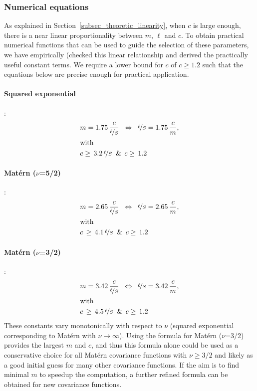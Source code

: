 \subsubsection{Numerical equations}
\label{sec_num_equations}

As explained in Section~\ref{subsec_theoretic_linearity}, when $c$ is large enough, there is a near linear proportionality between $m$, $\ell$ and $c$. To obtain practical numerical functions that can be used to guide the selection of these parameters, we have empirically ({\color{blue}checked this linear relationship and} derived the practically useful constant terms. We require a lower bound for $c$ of $c \geq 1.2$ such that the equations below are precise enough for practical application.

\paragraph*{Squared exponential}:
%
\begin{align}
&m= 1.75 \, \frac{c}{\nicefrac{\ell}{S}} \;\; \Leftrightarrow \;\; \nicefrac{\ell}{S}= 1.75 \, \frac{c}{m},	\label{eq_m_l_QE} \\
&\text{with} \nonumber \\
&c \geq \, 3.2 \, \nicefrac{\ell}{S} \;\; \& \;\, c \geq \, 1.2	\label{eq_c_vs_l_QE}
\end{align}

\paragraph*{Mat\'ern ($\nu$=5/2)}:
%
\begin{align}
&m= 2.65 \, \frac{c}{\nicefrac{\ell}{S}} \;\; \Leftrightarrow \;\; \nicefrac{\ell}{S}= 2.65 \, \frac{c}{m}, \label{eq_m_l_mat52} \\
&\text{with} \nonumber \\
&c \, \geq \, 4.1 \, \nicefrac{\ell}{S} \;\; \& \;\, c \geq \, 1.2  \label{eq_c_vs_l_mat52}
\end{align}

\paragraph*{Mat\'ern ($\nu$=3/2)}:
%
\begin{align}
&m= 3.42 \, \frac{c}{\nicefrac{\ell}{S}} \;\; \Leftrightarrow \;\; \nicefrac{\ell}{S}= 3.42 \, \frac{c}{m}, \label{eq_m_l_mat32}\\
&\text{with} \nonumber \\
&c \, \geq \, 4.5 \, \nicefrac{\ell}{S} \;\; \& \;\, c \geq \, 1.2 \label{eq_c_vs_l_mat32}
\end{align}
%
These constants vary monotonically with respect to $\nu$ (squared exponential corresponding to Mat\'ern with $\nu \to \infty$). Using the formula for Mat\'ern ($\nu$=3/2) provides the largest $m$ and $c$, and thus this formula alone could be used as a conservative choice for all Mat\'ern covariance functions with $\nu \geq 3/2$ and likely as a good initial guess for many other covariance functions. If the aim is to find minimal $m$ to speedup the computation, a further refined formula can be obtained for new covariance functions.

